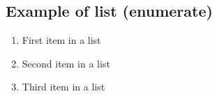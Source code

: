 \documentclass[paper=a4, fontsize=11pt]{scrartcl} %
\numberwithin{equation}{section} %
\numberwithin{figure}{section} %
\numberwithin{table}{section} %
\begin{document}

\subsection{Example of list (enumerate)}
\begin{enumerate}
\item First item in a list 
\item Second item in a list 
\item Third item in a list
\end{enumerate}

\fi
\end{document}
